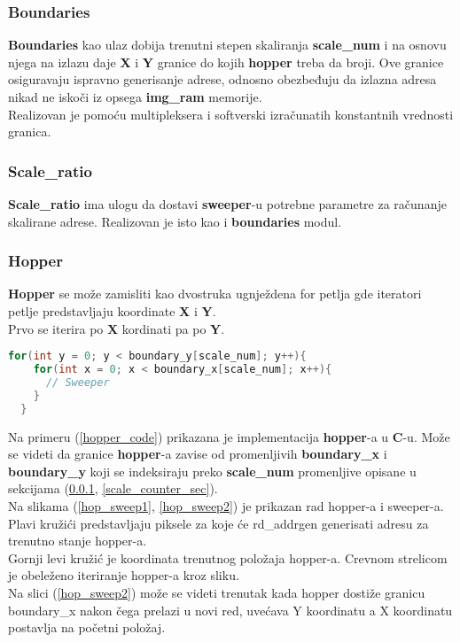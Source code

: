 \subsubsection{Boundaries}\label{boundaries_sec}
\textbf{Boundaries} kao ulaz dobija trenutni stepen skaliranja
\textbf{scale\_num} i na osnovu njega na izlazu daje \textbf{X} i \textbf{Y} granice do kojih
\textbf{hopper} treba da broji.
Ove granice osiguravaju ispravno generisanje adrese, odnosno obezbeđuju da
izlazna adresa nikad ne iskoči iz opsega \textbf{img\_ram} memorije. \\
Realizovan je pomoću multipleksera i softverski izračunatih konstantnih
vrednosti granica. \\

\subsubsection{Scale\_ratio}\label{scale_ratio_sec}
\textbf{Scale\_ratio} ima ulogu da dostavi \textbf{sweeper}-u potrebne parametre za
računanje skalirane adrese.
Realizovan je isto kao i \textbf{boundaries} modul. \\

\subsubsection{Hopper}\label{hopper_sec}
\textbf{Hopper} se može zamisliti kao dvostruka ugnježdena for petlja gde
iteratori petlje predstavljaju koordinate \textbf{X} i \textbf{Y}. \\
Prvo se iterira po \textbf{X} kordinati pa po \textbf{Y}.

\begin{lstlisting}[language=C++,caption={Primer \textbf{hopper}-a u \textbf{C}-u},captionpos=b, label=hopper_code]
  for(int y = 0; y < boundary_y[scale_num]; y++){
    for(int x = 0; x < boundary_x[scale_num]; x++){
      // Sweeper
    }
  }
\end{lstlisting}

Na primeru (\ref{hopper_code}) prikazana je implementacija \textbf{hopper}-a u
\textbf{C}-u.
Može se videti da granice \textbf{hopper}-a zavise od promenljivih
\textbf{boundary\_x} i \textbf{boundary\_y} koji se indeksiraju preko
\textbf{scale\_num} promenljive opisane u sekcijama (\ref{boundaries_sec},
\ref{scale_counter_sec}). \\

Na slikama (\ref{hop_sweep1}, \ref{hop_sweep2}) je prikazan rad hopper-a i
sweeper-a.
Plavi kružići predstavljaju piksele za koje će
rd\_addrgen generisati adresu za trenutno stanje hopper-a. \\
Gornji levi kružić je koordinata trenutnog položaja hopper-a.
Crevnom strelicom je obeleženo iteriranje hopper-a kroz sliku. \\
Na slici (\ref{hop_sweep2}) može se videti trenutak kada hopper dostiže granicu
boundary\_x nakon čega prelazi u novi red, uvećava Y koordinatu a X koordinatu
postavlja na početni položaj. \\

